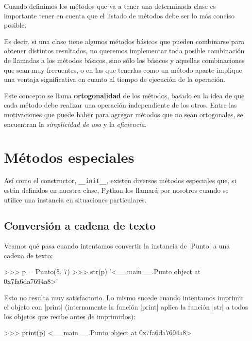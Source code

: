 \begin{atencion}
Cuando definimos los métodos que va a tener una determinada clase es
importante tener en cuenta que el listado de métodos debe ser lo más
conciso posible.

Es decir, si una clase tiene algunos métodos básicos que pueden combinarse
para obtener distintos resultados, no queremos implementar toda posible
combinación de llamadas a los métodos básicos, sino sólo los básicos y
aquellas combinaciones que sean muy frecuentes, o en las que
tenerlas como un método aparte implique una ventaja significativa en cuanto
al tiempo de ejecución de la operación.

Este concepto se llama {\bf ortogonalidad} de los métodos, basado en la
idea de que cada método debe realizar una operación independiente de los
otros.  Entre las motivaciones que puede haber para agregar métodos que no
sean ortogonales, se encuentran la \emph{simplicidad de uso} y la
\emph{eficiencia}.
\end{atencion}

\section{Métodos especiales}

Así como el constructor, \lstinline!__init__!, existen diversos métodos
especiales que, si están definidos en nuestra clase, Python los llamará por
nosotros cuando se utilice una instancia en situaciones particulares.

\subsection{Conversión a cadena de texto}

Veamos qué pasa cuando intentamos convertir la instancia de |Punto| a una
cadena de texto:

\begin{codigo-python-sn}
>>> p = Punto(5, 7)
>>> str(p)
'<__main__.Punto object at 0x7fa6da7694a8>'
\end{codigo-python-sn}

Esto no resulta muy satisfactorio. Lo mismo sucede cuando intentamos imprimir
el objeto con |print| (internamente la función |print| aplica la función |str|
a todos los objetos que recibe antes de imprimirlos):

\begin{codigo-python-sn}
>>> print(p)
<__main__.Punto object at 0x7fa6da7694a8>
\end{codigo-python-sn}

